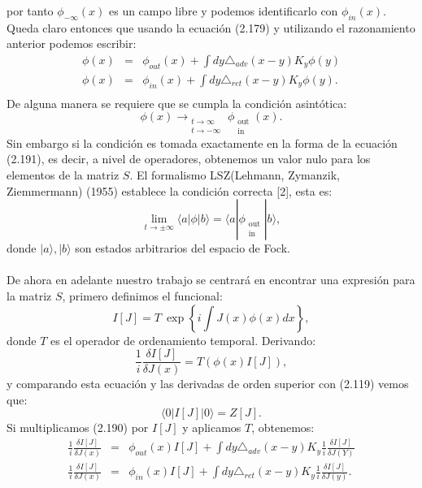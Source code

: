 por tanto $\phi_{-\infty}(x)$ es un campo libre y podemos identificarlo con $\phi_{in}(x)$. Queda claro entonces que usando la ecuación (2.179) y utilizando el razonamiento anterior podemos escribir:
\begin{eqnarray}
\nonumber \phi(x)&=&\phi_{out}(x)+\int dy\triangle_{adv}(x-y)K_{y}\phi(y)\\
\nonumber \phi(x)&=&\phi_{in}(x)+\int dy\triangle_{ret}(x-y)K_{y}\phi(y).\\
\end{eqnarray}
De alguna manera se requiere que se cumpla la condición asintótica:
\begin{equation}
 \phi(x)\longrightarrow_{\substack{t\to\infty \\t\to-\infty}}\phi_{\substack{\text{out}\\ \text{in}}}(x).	
\end{equation} 
Sin embargo si la condición es tomada exactamente en la forma de la ecuación (2.191), es decir, a nivel de operadores, obtenemos un valor nulo para los elementos de la matriz $S$. El formalismo LSZ(Lehmann, Zymanzik, Ziemmermann) (1955) establece la condición correcta [2], esta es:
\begin{equation}
\lim_{t\to\pm\infty}\langle a|\phi|b\rangle=\langle a|\phi_{\substack{\text{out}\\ \text{in}}}|b\rangle ,
\end{equation}
donde $|a\rangle,|b\rangle$ son estados arbitrarios del espacio de Fock.
\\
\\
De ahora en adelante nuestro trabajo se centrará en encontrar una expresión para la matriz $S$, primero definimos el funcional:
\begin{equation}
I[J]=T\ \exp\left\{ i\int J(x)\phi(x)dx\right\} ,
\end{equation}
donde $T$ es el operador de ordenamiento temporal. Derivando:
\begin{equation}
\frac{1}{i}\frac{\delta I[J]}{\delta J(x)}=T(\phi(x)I[J]),
\end{equation} 
y comparando esta ecuación y las derivadas de orden superior con (2.119) vemos que:
\begin{equation}
\langle 0|I[J]|0\rangle=Z[J].
\end{equation}
Si multiplicamos (2.190) por $I[J]$ y aplicamos $T$, obtenemos:
\begin{eqnarray}
\nonumber \frac{1}{i}\frac{\delta I[J]}{\delta J(x)}&=&\phi_{out}(x)I[J]+\int dy\triangle_{adv}(x-y)K_{y}\frac{1}{i}\frac{\delta I[J]}{\delta J(Y)}\\
\nonumber \frac{1}{i}\frac{\delta I[J]}{\delta J(x)}&=&\phi_{in}(x)I[J]+\int dy\triangle_{ret}(x-y)K_{y}\frac{1}{i}\frac{\delta I[J]}{\delta J(y)}.\\
\end{eqnarray}
